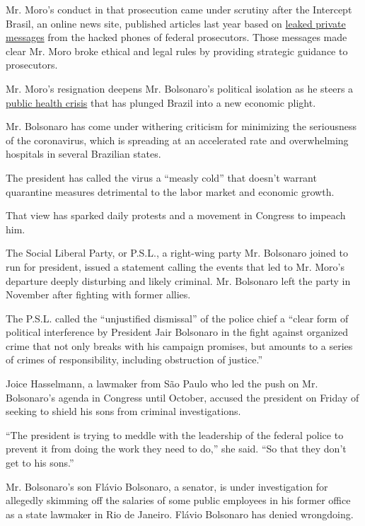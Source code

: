 Mr. Moro's conduct in that prosecution came under scrutiny after the
Intercept Brasil, an online news site, published articles last year
based on
\href{https://www.nytimes3xbfgragh.onion/2019/06/10/world/americas/brazil-car-wash-lava-jato.html}{leaked
private messages} from the hacked phones of federal prosecutors. Those
messages made clear Mr. Moro broke ethical and legal rules by providing
strategic guidance to prosecutors.

Mr. Moro's resignation deepens Mr. Bolsonaro's political isolation as he
steers a
\href{https://www.nytimes3xbfgragh.onion/2020/04/01/world/americas/brazil-bolsonaro-coronavirus.html}{public
health crisis} that has plunged Brazil into a new economic plight.

Mr. Bolsonaro has come under withering criticism for minimizing the
seriousness of the coronavirus, which is spreading at an accelerated
rate and overwhelming hospitals in several Brazilian states.

The president has called the virus a ``measly cold'' that doesn't
warrant quarantine measures detrimental to the labor market and economic
growth.

That view has sparked daily protests and a movement in Congress to
impeach him.

The Social Liberal Party, or P.S.L., a right-wing party Mr. Bolsonaro
joined to run for president, issued a statement calling the events that
led to Mr. Moro's departure deeply disturbing and likely criminal. Mr.
Bolsonaro left the party in November after fighting with former allies.

The P.S.L. called the ``unjustified dismissal'' of the police chief a
``clear form of political interference by President Jair Bolsonaro in
the fight against organized crime that not only breaks with his campaign
promises, but amounts to a series of crimes of responsibility, including
obstruction of justice.''

Joice Hasselmann, a lawmaker from São Paulo who led the push on Mr.
Bolsonaro's agenda in Congress until October, accused the president on
Friday of seeking to shield his sons from criminal investigations.

``The president is trying to meddle with the leadership of the federal
police to prevent it from doing the work they need to do,'' she said.
``So that they don't get to his sons.''

Mr. Bolsonaro's son Flávio Bolsonaro, a senator, is under investigation
for allegedly skimming off the salaries of some public employees in his
former office as a state lawmaker in Rio de Janeiro. Flávio Bolsonaro
has denied wrongdoing.

